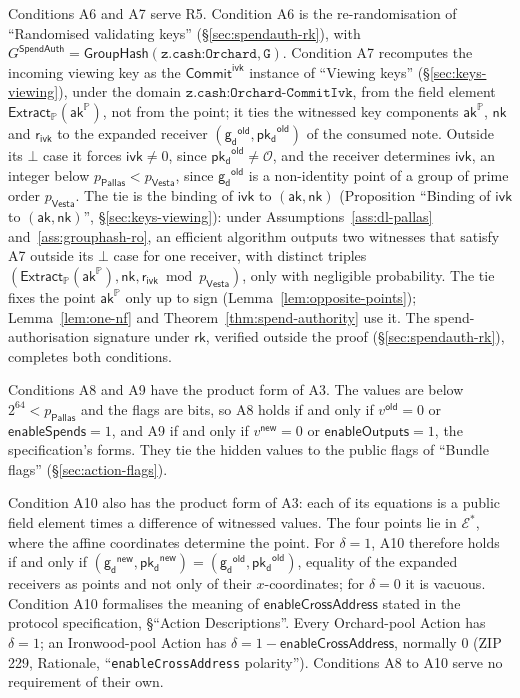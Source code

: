\documentclass[11pt,a4paper]{article}
\theoremstyle{definition}
\newcommand{\PP}{\mathbb{P}}
\newcommand{\rk}{\mathsf{rk}}
\newcommand{\Pallas}{\ensuremath{\mathsf{Pallas}}}
\newcommand{\Vesta}{\ensuremath{\mathsf{Vesta}}}
\newcommand{\Ep}{\ensuremath{\mathcal{E}}}
\newcommand{\CommitIvk}{\ensuremath{\mathsf{Commit}^{\mathsf{ivk}}}}
\newcommand{\Extract}{\ensuremath{\mathsf{Extract}}}
\newcommand{\GroupHash}{\ensuremath{\mathsf{GroupHash}}}
\newcommand{\aksym}{\ensuremath{\mathsf{ak}}}
\newcommand{\nksym}{\ensuremath{\mathsf{nk}}}
\newcommand{\ivk}{\ensuremath{\mathsf{ivk}}}
\newcommand{\pkd}{\ensuremath{\mathsf{pk_d}}}
\newcommand{\gd}{\ensuremath{\mathsf{g_d}}}
\newcommand{\rivk}{\ensuremath{\mathsf{r_{ivk}}}}
\begin{document}
Conditions A6 and A7 serve R5. Condition A6 is the re-randomisation of
``Randomised validating keys'' (\S\ref{sec:spendauth-rk}), with
$G^{\mathsf{SpendAuth}} = \GroupHash(\texttt{z.cash:Orchard}, \texttt{G})$.
Condition A7 recomputes the incoming viewing key as the $\CommitIvk$
instance of ``Viewing keys'' (\S\ref{sec:keys-viewing}), under the domain
$\texttt{z.cash:Orchard-CommitIvk}$, from the field element
$\Extract_{\PP}(\aksym^{\PP})$, not from the point; it ties the witnessed key
components $\aksym^{\PP}$, $\nksym$ and $\rivk$ to the expanded receiver
$(\gd^{\mathsf{old}}, \pkd^{\mathsf{old}})$ of the consumed note. Outside its
$\bot$ case it forces $\ivk \neq 0$, since $\pkd^{\mathsf{old}} \neq
\mathcal{O}$, and the receiver determines $\ivk$, an integer below
$p_{\Pallas} < p_{\Vesta}$, since $\gd^{\mathsf{old}}$ is a non-identity
point of a group of prime order $p_{\Vesta}$. The tie is the binding of
$\ivk$ to $(\aksym, \nksym)$ (Proposition ``Binding of $\ivk$ to
$(\aksym, \nksym)$'', \S\ref{sec:keys-viewing}): under
Assumptions~\ref{ass:dl-pallas} and~\ref{ass:grouphash-ro}, an efficient
algorithm outputs two witnesses that satisfy A7 outside its $\bot$ case for
one receiver, with distinct triples
$(\Extract_{\PP}(\aksym^{\PP}), \nksym, \rivk \bmod p_{\Vesta})$, only
with negligible probability. The tie fixes the point $\aksym^{\PP}$ only up
to sign (Lemma~\ref{lem:opposite-points}); Lemma~\ref{lem:one-nf} and
Theorem~\ref{thm:spend-authority} use it. The spend-authorisation
signature under $\rk$, verified outside the proof (\S\ref{sec:spendauth-rk}),
completes both conditions.

Conditions A8 and A9 have the product form of A3. The values are below
$2^{64} < p_{\Pallas}$ and the flags are bits, so A8 holds if and only if
$v^{\mathsf{old}} = 0$ or $\mathsf{enableSpends} = 1$, and A9 if and only if
$v^{\mathsf{new}} = 0$ or $\mathsf{enableOutputs} = 1$, the specification's
forms. They tie the hidden values to the public flags of ``Bundle flags''
(\S\ref{sec:action-flags}).

Condition A10 also has the product form of A3: each of its equations is a
public field element times a difference of witnessed values. The four points
lie in $\Ep^{*}$, where the affine coordinates determine the point. For
$\delta = 1$, A10 therefore holds if and only if
$(\gd^{\mathsf{new}}, \pkd^{\mathsf{new}}) = (\gd^{\mathsf{old}},
\pkd^{\mathsf{old}})$, equality of the expanded receivers as points and not
only of their $x$-coordinates; for $\delta = 0$ it is vacuous. Condition A10
formalises the meaning of $\mathsf{enableCrossAddress}$ stated in the
protocol specification, \S``Action Descriptions''. Every Orchard-pool Action
has $\delta = 1$; an Ironwood-pool Action has
$\delta = 1 - \mathsf{enableCrossAddress}$, normally $0$ (ZIP 229, Rationale,
``\texttt{enableCrossAddress} polarity''). Conditions A8 to A10 serve no
requirement of their own.
\end{document}
